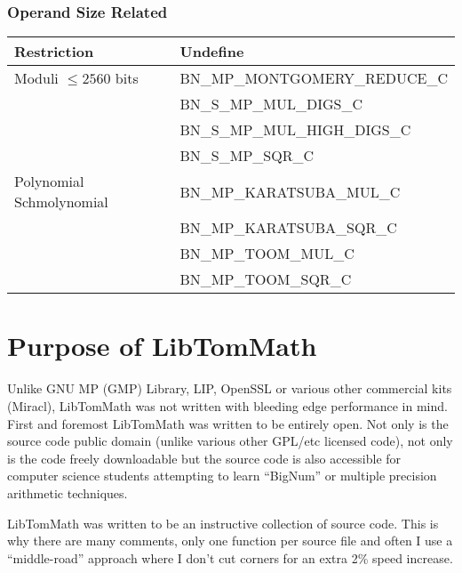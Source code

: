 \documentclass[synpaper]{book}
\begin{document}
\subsubsection{Operand Size Related}
\begin{small}
\begin{center}
\begin{tabular}{|l|l|}
\hline \textbf{Restriction} & \textbf{Undefine} \\
\hline Moduli $\le 2560$ bits              & BN\_MP\_MONTGOMERY\_REDUCE\_C \\
                                           & BN\_S\_MP\_MUL\_DIGS\_C \\
                                           & BN\_S\_MP\_MUL\_HIGH\_DIGS\_C \\
                                           & BN\_S\_MP\_SQR\_C \\
\hline Polynomial Schmolynomial            & BN\_MP\_KARATSUBA\_MUL\_C \\
                                           & BN\_MP\_KARATSUBA\_SQR\_C \\
                                           & BN\_MP\_TOOM\_MUL\_C \\
                                           & BN\_MP\_TOOM\_SQR\_C \\

\hline
\end{tabular}
\end{center}
\end{small}


\section{Purpose of LibTomMath}
Unlike  GNU MP (GMP) Library, LIP, OpenSSL or various other commercial kits (Miracl), LibTomMath was not written with
bleeding edge performance in mind.  First and foremost LibTomMath was written to be entirely open.  Not only is the
source code public domain (unlike various other GPL/etc licensed code), not only is the code freely downloadable but the
source code is also accessible for computer science students attempting to learn ``BigNum'' or multiple precision
arithmetic techniques.

LibTomMath was written to be an instructive collection of source code.  This is why there are many comments, only one
function per source file and often I use a ``middle-road'' approach where I don't cut corners for an extra 2\% speed
increase.
\end{document}
